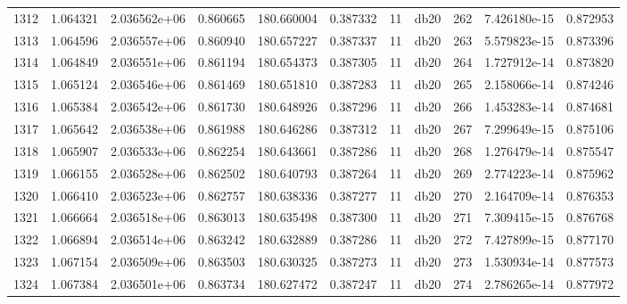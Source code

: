 \begin{tabular}{lrrrrrrlrrr}
1312 &    1.064321 &        2.036562e+06 &  0.860665 &              180.660004 &    0.387332 &      11 &         db20 &    262 &   7.426180e-15 &      0.872953 \\
1313 &    1.064596 &        2.036557e+06 &  0.860940 &              180.657227 &    0.387337 &      11 &         db20 &    263 &   5.579823e-15 &      0.873396 \\
1314 &    1.064849 &        2.036551e+06 &  0.861194 &              180.654373 &    0.387305 &      11 &         db20 &    264 &   1.727912e-14 &      0.873820 \\
1315 &    1.065124 &        2.036546e+06 &  0.861469 &              180.651810 &    0.387283 &      11 &         db20 &    265 &   2.158066e-14 &      0.874246 \\
1316 &    1.065384 &        2.036542e+06 &  0.861730 &              180.648926 &    0.387296 &      11 &         db20 &    266 &   1.453283e-14 &      0.874681 \\
1317 &    1.065642 &        2.036538e+06 &  0.861988 &              180.646286 &    0.387312 &      11 &         db20 &    267 &   7.299649e-15 &      0.875106 \\
1318 &    1.065907 &        2.036533e+06 &  0.862254 &              180.643661 &    0.387286 &      11 &         db20 &    268 &   1.276479e-14 &      0.875547 \\
1319 &    1.066155 &        2.036528e+06 &  0.862502 &              180.640793 &    0.387264 &      11 &         db20 &    269 &   2.774223e-14 &      0.875962 \\
1320 &    1.066410 &        2.036523e+06 &  0.862757 &              180.638336 &    0.387277 &      11 &         db20 &    270 &   2.164709e-14 &      0.876353 \\
1321 &    1.066664 &        2.036518e+06 &  0.863013 &              180.635498 &    0.387300 &      11 &         db20 &    271 &   7.309415e-15 &      0.876768 \\
1322 &    1.066894 &        2.036514e+06 &  0.863242 &              180.632889 &    0.387286 &      11 &         db20 &    272 &   7.427899e-15 &      0.877170 \\
1323 &    1.067154 &        2.036509e+06 &  0.863503 &              180.630325 &    0.387273 &      11 &         db20 &    273 &   1.530934e-14 &      0.877573 \\
1324 &    1.067384 &        2.036501e+06 &  0.863734 &              180.627472 &    0.387247 &      11 &         db20 &    274 &   2.786265e-14 &      0.877972 \\

\end{tabular}
